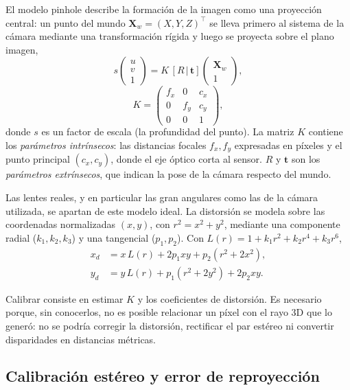 \documentclass[conference]{IEEEtran}
\begin{document}
El modelo pinhole describe la formación de la imagen como una proyección
central: un punto del mundo $\mathbf{X}_w=(X,Y,Z)^\top$ se lleva primero al
sistema de la cámara mediante una transformación rígida y luego se proyecta
sobre el plano imagen,
\begin{equation}
  s\begin{pmatrix}u\\v\\1\end{pmatrix}
  = K\,[R\,|\,\mathbf{t}]
  \begin{pmatrix}\mathbf{X}_w\\1\end{pmatrix},
  \label{eq:pinhole}
\end{equation}
\begin{equation}
  K=\begin{pmatrix} f_x & 0 & c_x\\ 0 & f_y & c_y\\ 0&0&1\end{pmatrix},
\end{equation}
donde $s$ es un factor de escala (la profundidad del punto). La matriz $K$
contiene los \emph{parámetros intrínsecos}: las distancias focales $f_x, f_y$
expresadas en píxeles y el punto principal $(c_x, c_y)$, donde el eje óptico
corta al sensor. $R$ y $\mathbf{t}$ son los \emph{parámetros extrínsecos}, que
indican la pose de la cámara respecto del mundo.

Las lentes reales, y en particular las gran angulares como las de la cámara
utilizada, se apartan de este modelo ideal. La distorsión se modela sobre las
coordenadas normalizadas $(x,y)$, con $r^2=x^2+y^2$, mediante una componente
radial ($k_1,k_2,k_3$) y una tangencial ($p_1,p_2$). Con
$L(r)=1+k_1r^2+k_2r^4+k_3r^6$,
\begin{align}
  x_d &= x\,L(r) + 2p_1xy + p_2(r^2+2x^2),\\
  y_d &= y\,L(r) + p_1(r^2+2y^2) + 2p_2xy.
\end{align}

Calibrar consiste en estimar $K$ y los coeficientes de distorsión. Es
necesario porque, sin conocerlos, no es posible relacionar un píxel con el
rayo 3D que lo generó: no se podría corregir la distorsión, rectificar el par
estéreo ni convertir disparidades en distancias métricas.

\subsection{Calibración estéreo y error de reproyección}
\end{document}
